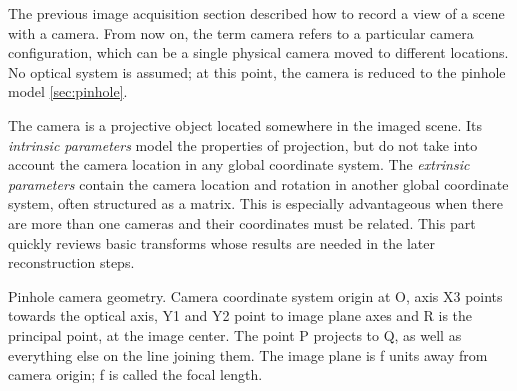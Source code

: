 


The previous image acquisition section described how to record a view of a scene with a camera. From now on, the term camera refers to a particular camera configuration, which can be a single physical camera moved to different locations.
No optical system is assumed; at this point, the camera is reduced to the pinhole model \ref{sec:pinhole}.


The camera is a projective object located somewhere in the imaged scene.
Its \textit{intrinsic parameters} model the properties of projection, but do not take into account the camera location in any global coordinate system.
The \textit{extrinsic parameters} contain the camera location and rotation in another global coordinate system, often structured as a matrix.
This is especially advantageous when there are more than one cameras and their coordinates must be related.
\cite{hartley03multiview,heyden2005multiple}
This part quickly reviews basic transforms whose results are needed in the later reconstruction steps.


{Pinhole camera geometry. Camera coordinate system origin at O, axis X3 points towards the optical axis, Y1 and Y2 point to image plane axes and R is the principal point, at the image center. The point P projects to Q, as well as everything else on the line joining them. The image plane is f units away from camera origin; f is called the focal length.}

